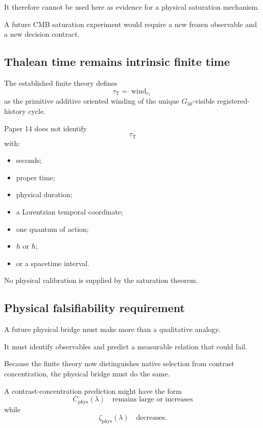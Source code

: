 It therefore cannot be used here as evidence for a physical
saturation mechanism.

A future CMB saturation experiment would require a new frozen
observable and a new decision contract.

\subsection{Thalean time remains intrinsic finite time}

The established finite theory defines
\[
\tau_{\mathrm T}
=
\operatorname{wind}_{r_1}
\]
as the primitive additive oriented winding of the unique
\(G_{30}\)-visible registered-history cycle.

Paper 14 does not identify
\[
\tau_{\mathrm T}
\]
with:

\begin{itemize}

\item seconds;

\item proper time;

\item physical duration;

\item a Lorentzian temporal coordinate;

\item one quantum of action;

\item \(h\) or \(\hbar\);

\item or a spacetime interval.

\end{itemize}

No physical calibration is supplied by the saturation theorem.

\subsection{Physical falsifiability requirement}


A future physical bridge must make more than a qualitative analogy.

It must identify observables and predict a measurable relation that
could fail.

Because the finite theory now distinguishes native selection from
contrast concentration, the physical bridge must do the same.

A contrast-concentration prediction might have the form
\[
C_{\mathrm{phys}}(\lambda)
\quad
\text{remains large or increases}
\]
while
\[
\zeta_{\mathrm{phys}}(\lambda)
\quad
\text{decreases}.
\]

